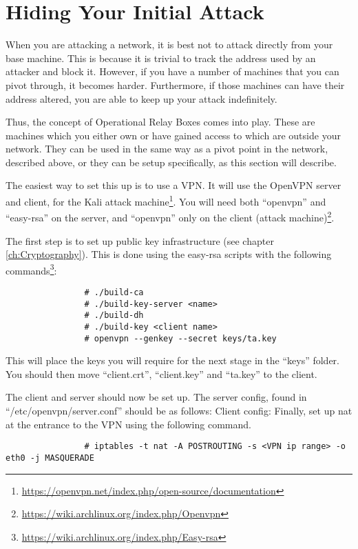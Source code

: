 	\section{Hiding Your Initial Attack}
		When you are attacking a network, it is best not to attack directly from your base machine.
		This is because it is trivial to track the address used by an attacker and block it.
		However, if you have a number of machines that you can pivot through, it becomes harder.
		Furthermore, if those machines can have their address altered, you are able to keep up your attack indefinitely.

		Thus, the concept of Operational Relay Boxes comes into play.
		These are machines which you either own or have gained access to which are outside your network.
		They can be used in the same way as a pivot point in the network, described above, or they can be setup specifically, as this section will describe.

		 
		The easiest way to set this up is to use a VPN.
		It will use the OpenVPN server and client, for the Kali attack machine\footnote{\url{https://openvpn.net/index.php/open-source/documentation}}.
		You will need both ``openvpn'' and ``easy-rsa'' on the server, and ``openvpn'' only on the client (attack machine)\footnote{\url{https://wiki.archlinux.org/index.php/Openvpn}}.

		The first step is to set up public key infrastructure (see chapter \ref{ch:Cryptography}).
		This is done using the easy-rsa scripts with the following commands\footnote{\url{https://wiki.archlinux.org/index.php/Easy-rsa}}:
			\begin{verbatim}
				# ./build-ca
				# ./build-key-server <name>
				# ./build-dh
				# ./build-key <client name>
				# openvpn --genkey --secret keys/ta.key
			\end{verbatim}
		This will place the keys you will require for the next stage in the ``keys'' folder.
		You should then move ``client.crt'', ``client.key'' and ``ta.key'' to the client.

		The client and server should now be set up.
		The server config, found in ``/etc/openvpn/server.conf'' should be as follows:
		Client config:
		Finally, set up nat at the entrance to the VPN using the following command.
			\begin{verbatim}
				# iptables -t nat -A POSTROUTING -s <VPN ip range> -o eth0 -j MASQUERADE
			\end{verbatim}

